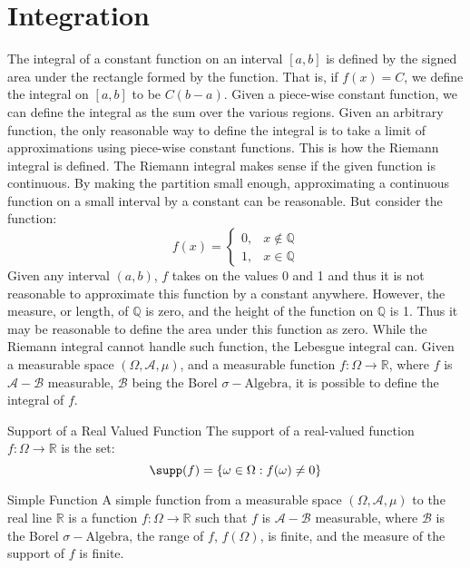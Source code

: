 \section{Integration}
    The integral of a constant function on an interval
    $[a,b]$ is defined by the signed area under the
    rectangle formed by the function. That is, if
    $f(x)=C$, we define the integral on $[a,b]$ to
    be $C(b-a)$. Given a piece-wise constant function,
    we can define the integral as the sum over the
    various regions. Given an arbitrary function, the
    only reasonable way to define the integral is to
    take a limit of approximations using piece-wise
    constant functions. This is how the Riemann integral
    is defined. The Riemann integral makes sense if
    the given function is continuous. By making the
    partition small enough, approximating a continuous
    function on a small interval by a constant can be
    reasonable. But consider the function:
    \begin{equation}
        f(x)=
        \begin{cases}
            0,&x\notin\mathbb{Q}\\
            1,&x\in\mathbb{Q}
        \end{cases}
    \end{equation}
    Given any interval $(a,b)$, $f$ takes on the values
    0 and 1 and thus it is not reasonable to approximate
    this function by a constant anywhere. However,
    the measure, or length, of $\mathbb{Q}$ is zero, and
    the height of the function on $\mathbb{Q}$ is 1.
    Thus it may be reasonable to define the area under
    this function as zero. While the Riemann integral
    cannot handle such function, the Lebesgue integral
    can. Given a measurable space
    $(\Omega,\mathcal{A},\mu)$, and a measurable
    function $f:\Omega\rightarrow\mathbb{R}$, where
    $f$ is $\mathcal{A}-\mathcal{B}$ measurable,
    $\mathcal{B}$ being the Borel
    $\sigma-\textrm{Algebra}$, it is possible to define
    the integral of $f$.
    \begin{ldefinition}
          {Support of a Real Valued Function}
        The support of a real-valued function
        $f:\Omega\rightarrow\mathbb{R}$ is the set:
        \begin{equation}
            \supp(f)=\{\omega\in\Omega:f(\omega)\ne{0}\}
        \end{equation}
    \end{ldefinition}
    \begin{ldefinition}{Simple Function}
        A simple function from a measurable space
        $(\Omega,\mathcal{A},\mu)$ to the real line
        $\mathbb{R}$ is a function
        $f:\Omega\rightarrow\mathbb{R}$ such that
        $f$ is $\mathcal{A}-\mathcal{B}$ measurable,
        where $\mathcal{B}$ is the Borel
        $\sigma-\textrm{Algebra}$, the range of $f$,
        $f(\Omega)$, is finite, and the measure of the
        support of $f$ is finite.
    \end{ldefinition}
